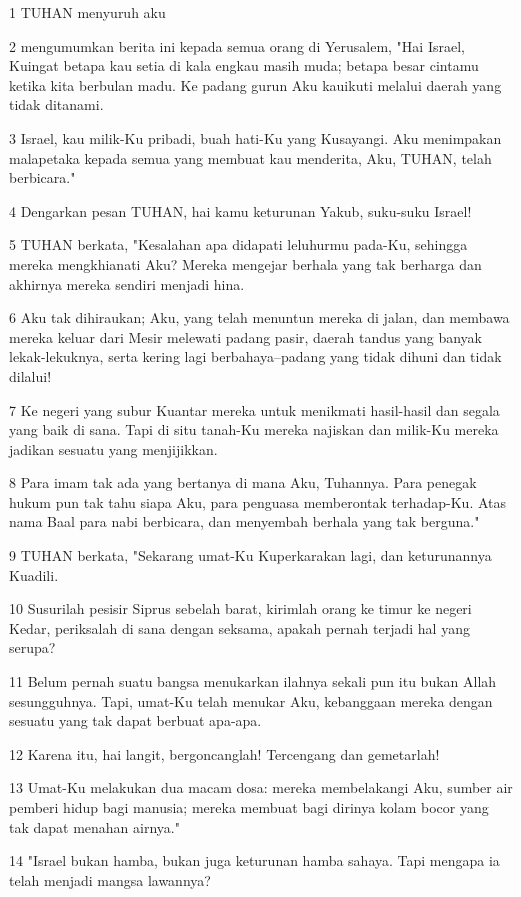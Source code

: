 \par 1 TUHAN menyuruh aku
\par 2 mengumumkan berita ini kepada semua orang di Yerusalem, "Hai Israel, Kuingat betapa kau setia di kala engkau masih muda; betapa besar cintamu ketika kita berbulan madu. Ke padang gurun Aku kauikuti melalui daerah yang tidak ditanami.
\par 3 Israel, kau milik-Ku pribadi, buah hati-Ku yang Kusayangi. Aku menimpakan malapetaka kepada semua yang membuat kau menderita, Aku, TUHAN, telah berbicara."
\par 4 Dengarkan pesan TUHAN, hai kamu keturunan Yakub, suku-suku Israel!
\par 5 TUHAN berkata, "Kesalahan apa didapati leluhurmu pada-Ku, sehingga mereka mengkhianati Aku? Mereka mengejar berhala yang tak berharga dan akhirnya mereka sendiri menjadi hina.
\par 6 Aku tak dihiraukan; Aku, yang telah menuntun mereka di jalan, dan membawa mereka keluar dari Mesir melewati padang pasir, daerah tandus yang banyak lekak-lekuknya, serta kering lagi berbahaya--padang yang tidak dihuni dan tidak dilalui!
\par 7 Ke negeri yang subur Kuantar mereka untuk menikmati hasil-hasil dan segala yang baik di sana. Tapi di situ tanah-Ku mereka najiskan dan milik-Ku mereka jadikan sesuatu yang menjijikkan.
\par 8 Para imam tak ada yang bertanya di mana Aku, Tuhannya. Para penegak hukum pun tak tahu siapa Aku, para penguasa memberontak terhadap-Ku. Atas nama Baal para nabi berbicara, dan menyembah berhala yang tak berguna."
\par 9 TUHAN berkata, "Sekarang umat-Ku Kuperkarakan lagi, dan keturunannya Kuadili.
\par 10 Susurilah pesisir Siprus sebelah barat, kirimlah orang ke timur ke negeri Kedar, periksalah di sana dengan seksama, apakah pernah terjadi hal yang serupa?
\par 11 Belum pernah suatu bangsa menukarkan ilahnya sekali pun itu bukan Allah sesungguhnya. Tapi, umat-Ku telah menukar Aku, kebanggaan mereka dengan sesuatu yang tak dapat berbuat apa-apa.
\par 12 Karena itu, hai langit, bergoncanglah! Tercengang dan gemetarlah!
\par 13 Umat-Ku melakukan dua macam dosa: mereka membelakangi Aku, sumber air pemberi hidup bagi manusia; mereka membuat bagi dirinya kolam bocor yang tak dapat menahan airnya."
\par 14 "Israel bukan hamba, bukan juga keturunan hamba sahaya. Tapi mengapa ia telah menjadi mangsa lawannya?
